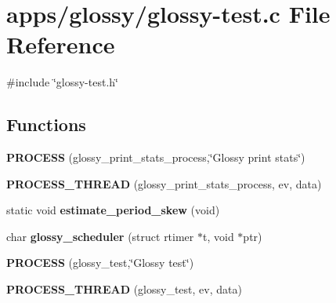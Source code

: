 \hypertarget{glossy-test_8c}{
\section{apps/glossy/glossy-\/test.c File Reference}
\label{glossy-test_8c}
}
{\ttfamily \#include \char`\"{}glossy-\/test.h\char`\"{}}\par
\subsection*{Functions}
\begin{DoxyCompactItemize}
\item 
\hypertarget{group__glossy-test-print-stats_ga10726d2aa7b149ad5485888bba70177c}{
{\bfseries PROCESS} (glossy\_\-print\_\-stats\_\-process,\char`\"{}Glossy print stats\char`\"{})}
\label{group__glossy-test-print-stats_ga10726d2aa7b149ad5485888bba70177c}

\item 
\hypertarget{group__glossy-test-print-stats_gad8f76fdcda797bef20444c5e4ee181c5}{
{\bfseries PROCESS\_\-THREAD} (glossy\_\-print\_\-stats\_\-process, ev, data)}
\label{group__glossy-test-print-stats_gad8f76fdcda797bef20444c5e4ee181c5}

\item 
\hypertarget{group__glossy-test-skew_ga0bf2ebfd243be5dc3cea2083c55d3f75}{
static void {\bfseries estimate\_\-period\_\-skew} (void)}
\label{group__glossy-test-skew_ga0bf2ebfd243be5dc3cea2083c55d3f75}

\item 
\hypertarget{group__glossy-test-scheduler_gaaf560632558b0a7395e5bc21090c04a4}{
char {\bfseries glossy\_\-scheduler} (struct rtimer $\ast$t, void $\ast$ptr)}
\label{group__glossy-test-scheduler_gaaf560632558b0a7395e5bc21090c04a4}

\item 
\hypertarget{group__glossy-test-init_gaedc8ea09700fab6ffa609345ef21407d}{
{\bfseries PROCESS} (glossy\_\-test,\char`\"{}Glossy test\char`\"{})}
\label{group__glossy-test-init_gaedc8ea09700fab6ffa609345ef21407d}

\item 
\hypertarget{group__glossy-test-init_ga017ea7392ceaa675dbf770b2fbe13097}{
{\bfseries PROCESS\_\-THREAD} (glossy\_\-test, ev, data)}
\label{group__glossy-test-init_ga017ea7392ceaa675dbf770b2fbe13097}

\end{DoxyCompactItemize}
